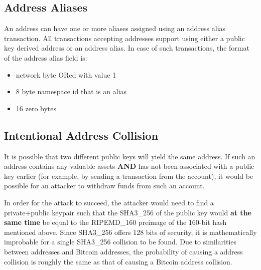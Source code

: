 \begin{figure}
\end{figure}

\pagebreak

\subsection{Address Aliases}
An address can have one or more aliases assigned using an address alias transaction.
All transactions accepting addresses support using either a public key derived address or an address alias.
In case of such transactions, the format of the address alias field is:
\begin{itemize}
	\item{network byte ORed with value 1}
	\item{8 byte namespace id that is an alias}
	\item{16 zero bytes}
\end{itemize}

\subsection{Intentional Address Collision}
It is possible that two different public keys will yield the same address.
If such an address contains any valuable assets \textbf{AND} has not been associated with a public key earlier (for example, by sending a transaction from the account), it would be possible for an attacker to withdraw funds from such an account.

In order for the attack to succeed, the attacker would need to find a private+public keypair such that the SHA3\_256 of the public key would \textbf{at the same time} be equal to the RIPEMD\_160 preimage of the 160-bit hash mentioned above.
Since SHA3\_256 offers 128 bits of security, it is mathematically improbable for a single SHA3\_256 collision to be found.
Due to similarities between \codenamespace addresses and Bitcoin addresses, the probability of causing a \codenamespace address collision is roughly the same as that of causing a Bitcoin address collision.

